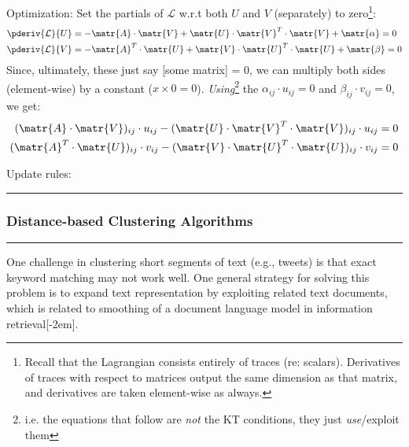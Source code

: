 \documentclass[11pt]{article}
\newcommand\myspace[1][]{\vspace{#1\bigskipamount}}
\newcommand\p{\Needspace{10\baselineskip} \noindent}
\newcommand\subsub[1]{\Needspace{15\baselineskip}\hrule\subsubsection{#1}\hrule}
\begin{document}
\begin{compactitem}
	\item Optimization: Set the partials of $\mathcal{L}$ w.r.t both $U$ and $V$ (separately) to zero\footnote{Recall that the Lagrangian consists entirely of traces (re: scalars). Derivatives of traces with respect to matrices output the same dimension as that matrix, and derivatives are taken element-wise as always.}:
	\begin{align}
		\pderiv{\mathcal{L}}{U} &= - \matr{A} \cdot \matr{V} 
			+ \matr{U} \cdot \matr{V}^T \cdot \matr{V}
			+ \matr{\alpha} = 0 \\
		\pderiv{\mathcal{L}}{V} &= - \matr{A}^T \cdot \matr{U} 
		+ \matr{V} \cdot \matr{U}^T \cdot \matr{U}
		+ \matr{\beta} = 0
	\end{align} 
	Since, ultimately, these just say [some matrix] = 0, we can multiply both sides (element-wise) by a constant ($x \times 0 = 0$). \textit{Using}\footnote{i.e. the equations that follow are \textit{not} the KT conditions, they just \textit{use}/exploit them\textellipsis} the  $\alpha_{ij} \cdot u_{ij} = 0$ and
	$\beta_{ij} \cdot v_{ij} = 0$, we get:
	\begin{align}
		(\matr{A} \cdot \matr{V})_{ij} \cdot u_{ij}
			- (\matr{U} \cdot \matr{V}^T \cdot \matr{V})_{ij} \cdot u_{ij}
			 &= 0 \\
		(\matr{A}^T \cdot \matr{U} )_{ij} \cdot v_{ij}
			- (\matr{V} \cdot \matr{U}^T \cdot \matr{U})_{ij} \cdot v_{ij}
		&= 0
	\end{align}
	
	\item Update rules:
\end{compactitem}

\myspace{}
\subsub{Distance-based Clustering Algorithms}
\myspace

\p One challenge in clustering short segments of text (e.g., tweets) is that exact keyword matching may not work well. One general strategy for solving this problem is to expand text representation by exploiting related text documents, which is related to smoothing of a document language model in information retrieval[-2em].
\end{document}

